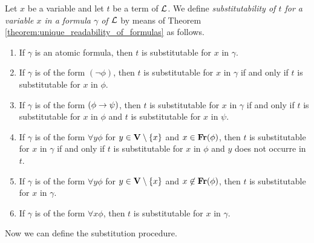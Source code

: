 \begin{definition}
Let $x$ be a variable and let $t$ be a term of ${\mathcal L}$. We define \textit{substitutability of $t$ for a variable $x$ in a formula $\gamma$ of ${\mathcal L}$} by means of Theorem \ref{theorem:unique_readability_of_formulas} as follows.
\begin{enumerate}[label=\textbf{(\arabic*)}, leftmargin=3.0em]
\item If $\gamma$ is an atomic formula, then $t$ is substitutable for $x$ in $\gamma$.
\item If $\gamma$ is of the form $(\neg \phi)$, then $t$ is substitutable for $x$ in $\gamma$ if and only if $t$ is substitutable for $x$ in $\phi$.
\item If $\gamma$ is of the form $(\phi \rightarrow  \psi)$, then $t$ is substitutable for $x$ in $\gamma$ if and only if $t$ is substitutable for $x$ in $\phi$ and $t$ is substitutable for $x$ in $\psi$.
\item If $\gamma$ is of the form $\forall y \phi$ for $y \in \mathbf{V}\setminus \{x\}$ and $x\in \mathbf{Fr}(\phi)$, then $t$ is substitutable for $x$ in $\gamma$ if and only if $t$ is substitutable for $x$ in $\phi$ and $y$ does not occurre in $t$.
\item If $\gamma$ is of the form $\forall y \phi$ for $y \in \mathbf{V}\setminus \{x\}$ and $x\not \in \mathbf{Fr}(\phi)$, then $t$ is substitutable for $x$ in $\gamma$.
\item If $\gamma$ is of the form $\forall x \phi$, then $t$ is substitutable for $x$ in $\gamma$.
\end{enumerate}
\end{definition}
\noindent
Now we can define the substitution procedure.


